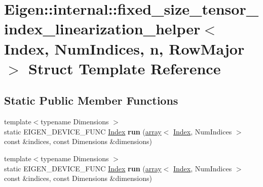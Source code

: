 \hypertarget{struct_eigen_1_1internal_1_1fixed__size__tensor__index__linearization__helper}{}\section{Eigen\+:\+:internal\+:\+:fixed\+\_\+size\+\_\+tensor\+\_\+index\+\_\+linearization\+\_\+helper$<$ Index, Num\+Indices, n, Row\+Major $>$ Struct Template Reference}
\label{struct_eigen_1_1internal_1_1fixed__size__tensor__index__linearization__helper}
\subsection*{Static Public Member Functions}
\begin{DoxyCompactItemize}
\item 
\mbox{\label{struct_eigen_1_1internal_1_1fixed__size__tensor__index__linearization__helper_ad9f850bf5d539ce2ceb45a27e8ae4975}} 
{\footnotesize template$<$typename Dimensions $>$ }\\static E\+I\+G\+E\+N\+\_\+\+D\+E\+V\+I\+C\+E\+\_\+\+F\+U\+NC \hyperlink{namespace_eigen_a62e77e0933482dafde8fe197d9a2cfde}{Index} {\bfseries run} (\hyperlink{class_eigen_1_1array}{array}$<$ \hyperlink{namespace_eigen_a62e77e0933482dafde8fe197d9a2cfde}{Index}, Num\+Indices $>$ const \&indices, const Dimensions \&dimensions)
\item 
\mbox{\label{struct_eigen_1_1internal_1_1fixed__size__tensor__index__linearization__helper_ad9f850bf5d539ce2ceb45a27e8ae4975}} 
{\footnotesize template$<$typename Dimensions $>$ }\\static E\+I\+G\+E\+N\+\_\+\+D\+E\+V\+I\+C\+E\+\_\+\+F\+U\+NC \hyperlink{namespace_eigen_a62e77e0933482dafde8fe197d9a2cfde}{Index} {\bfseries run} (\hyperlink{class_eigen_1_1array}{array}$<$ \hyperlink{namespace_eigen_a62e77e0933482dafde8fe197d9a2cfde}{Index}, Num\+Indices $>$ const \&indices, const Dimensions \&dimensions)
\end{DoxyCompactItemize}


